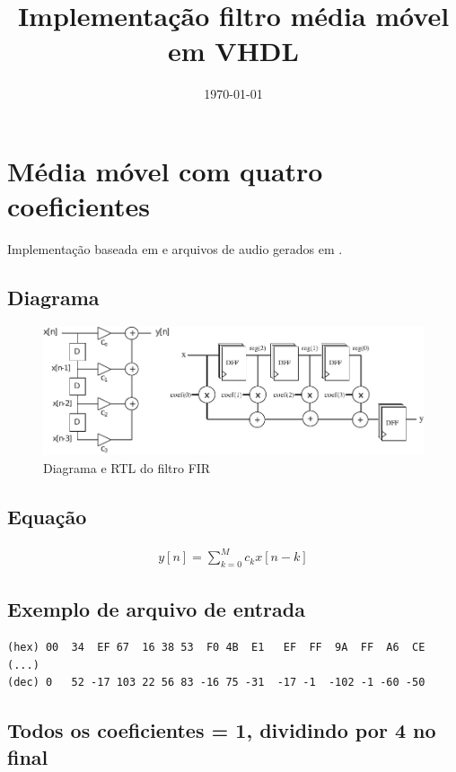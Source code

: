 \documentclass{article}
\title{Implementação filtro média móvel em VHDL}
\date{\today}
\begin{document}
\maketitle

\section{Média móvel com quatro coeficientes}

Implementação baseada em \cite{ped} e arquivos de audio gerados em \cite{oce}.

\subsection{Diagrama}

\begin{figure}[!htb]
	\centering
	\includegraphics[scale=1]{fir.pdf}
	\caption{Diagrama e RTL do filtro FIR}
	\label{fig:fir}
\end{figure}

\subsection{Equação}

\begin{eqnarray}
	y[n] = \sum_{k=0}^{M}c_kx[n-k]
\end{eqnarray}

\subsection{Exemplo de arquivo de entrada}

\begin{verbatim}
(hex) 00  34  EF 67  16 38 53  F0 4B  E1   EF  FF  9A  FF  A6  CE (...)
(dec) 0   52 -17 103 22 56 83 -16 75 -31  -17 -1  -102 -1 -60 -50
\end{verbatim}


\subsection{Todos os coeficientes = 1, dividindo por 4 no final}
\end{document}
